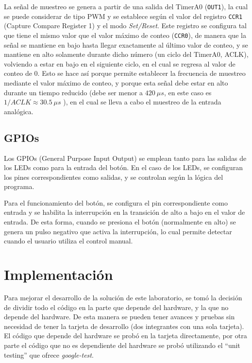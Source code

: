 La señal de muestreo se genera a partir de una salida del TimerA0 (\texttt{OUT1}), la cual se puede
considerar de tipo PWM y se establece según el valor del registro \texttt{CCR1} (Capture Compare
Register 1) y el modo \textit{Set/Reset}. Este registro se configura tal que tiene el mismo valor
que el valor máximo de conteo (\texttt{CCR0}), de manera que la señal se mantiene en bajo hasta
llegar exactamente al último valor de conteo, y se mantiene en alto solamente durante dicho número
(un ciclo del TimerA0, ACLK), volviendo a estar en bajo en el siguiente ciclo, en el cual se regresa
al valor de conteo de 0. Esto se hace así porque permite establecer la frecuencia de muestreo
mediante el valor máximo de conteo, y porque esta señal debe estar en alto durante un tiempo
reducido (debe ser menor a $420~\mu s$, en este caso es $1/ACLK \approx 30.5~\mu s$ ), en el cual se
lleva a cabo el muestreo de la entrada analógica.


\subsection{GPIOs}
Los GPIOs (General Purpose Input Output) se emplean tanto para las salidas de los LEDs como para la
entrada del botón. En el caso de los LEDs, se configuran los pines correspondientes como salidas, y
se controlan según la lógica del programa. 

Para el funcionamiento del botón, se configura el pin correspondiente como entrada y se habilita la
interrupción en la transición de alto a bajo en el valor de entrada. De esta forma, cuando se
presiona el botón (normalmente en alto) se genera un pulso negativo que activa la interrupción, lo
cual permite detectar cuando el usuario utiliza el control manual. 


\section{Implementación}

Para mejorar el desarrollo de la solución de este laboratorio, se tomó la decisión de dividir todo
el código en la parte que depende del hardware, y la que no depende del hardware. De esta manera se
pueden tener avances y pruebas sin necesidad de tener la tarjeta de desarrollo (dos integrantes con
una sola tarjeta). El código que depende del hardware se probó en la tarjeta directamente, por otra
parte el código que no es dependiente del hardware se probó utilizando el ``unit testing'' que
ofrece \textit{google-test}.

